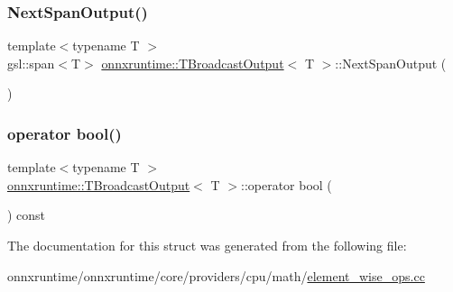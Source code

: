 \subsubsection{\texorpdfstring{Next\+Span\+Output()}{NextSpanOutput()}}
{\footnotesize\ttfamily template$<$typename T $>$ \\
gsl\+::span$<$T$>$ \mbox{\hyperlink{structonnxruntime_1_1TBroadcastOutput}{onnxruntime\+::\+T\+Broadcast\+Output}}$<$ T $>$\+::Next\+Span\+Output (\begin{DoxyParamCaption}{ }\end{DoxyParamCaption})\hspace{0.3cm}{\ttfamily [inline]}}

\mbox{\label{structonnxruntime_1_1TBroadcastOutput_a38d1cc8d50f4ccf6d39f8ac285e0b2d7}} 
\subsubsection{\texorpdfstring{operator bool()}{operator bool()}}
{\footnotesize\ttfamily template$<$typename T $>$ \\
\mbox{\hyperlink{structonnxruntime_1_1TBroadcastOutput}{onnxruntime\+::\+T\+Broadcast\+Output}}$<$ T $>$\+::operator bool (\begin{DoxyParamCaption}{ }\end{DoxyParamCaption}) const\hspace{0.3cm}{\ttfamily [inline]}}



The documentation for this struct was generated from the following file\+:\begin{DoxyCompactItemize}
\item 
onnxruntime/onnxruntime/core/providers/cpu/math/\mbox{\hyperlink{element__wise__ops_8cc}{element\+\_\+wise\+\_\+ops.\+cc}}\end{DoxyCompactItemize}

